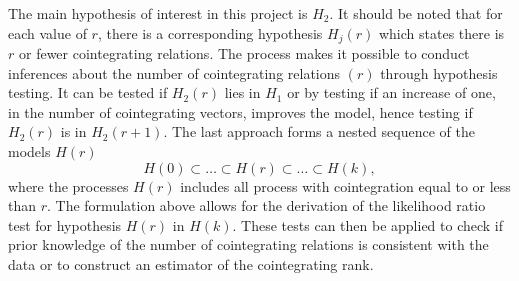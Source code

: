 The main hypothesis of interest in this project is $H_2$. It should be noted that for each value of $r$, there is a corresponding hypothesis $H_j(r)$ which states there is $r$ or fewer cointegrating relations. 
 \newline
 The process makes it possible to conduct inferences about the number of cointegrating relations $(r)$ through hypothesis testing. It can be tested if $H_2(r)$ lies in $H_1$ or by testing if an increase of one, in the number of cointegrating vectors, improves the model, hence testing if $H_2(r)$ is in $H_2(r+1)$. The last approach forms a nested sequence of the models $H(r)$
\begin{equation*}
    H(0) \subset \dots \subset H(r) \subset \dots \subset H(k),
\end{equation*}
where the processes $H(r)$ includes all process with cointegration equal to or less than $r$. The formulation above allows for the derivation of the likelihood ratio test for hypothesis $H(r)$ in $H(k)$. These tests can then be applied to check if prior knowledge of the number of cointegrating relations is consistent with the data or to construct an estimator of the cointegrating rank.



